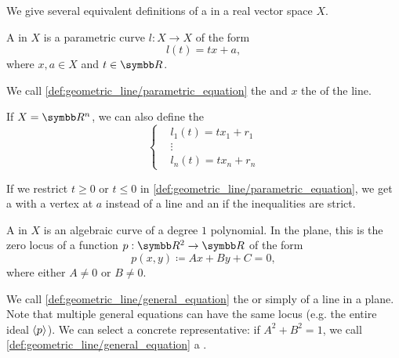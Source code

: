 \begin{definition}\label{def:geometric_line}
  We give several equivalent definitions of a  in a real vector space \( X \).

  \begin{defenum}
     A  in \( X \) is a parametric curve \( l: X \to X \) of the form
    \begin{equation}\label{def:geometric_line/parametric_equation}
      l(t) = tx + a,
    \end{equation}
    where \( x, a \in X \) and \( t \in \R \).

    We call \cref{def:geometric_line/parametric_equation} the  and \( x \) the  of the line.

    If \( X = \R^n \), we can also define the 
    \begin{equation}\label{def:geometric_line/scalar_parametric_equations}
      \begin{cases}
        &l_1(t) = t x_1 + r_1 \\
        &\vdots \\
        &l_n(t) = t x_n + r_n
      \end{cases}
    \end{equation}

     If we restrict \( t \geq 0 \) or \( t \leq 0 \) in \cref{def:geometric_line/parametric_equation}, we get a  with a vertex at \( a \) instead of a line and an  if the inequalities are strict.

     A  in \( X \) is an algebraic curve of a degree \( 1 \) polynomial. In the plane, this is the zero locus of a function \( p: \R^2 \to \R \) of the form
    \begin{equation}\label{def:geometric_line/general_equation}
      p(x, y) \coloneqq Ax + By + C = 0,
    \end{equation}
    where either \( A \neq 0 \) or \( B \neq 0 \).

    We call \cref{def:geometric_line/general_equation} the  or simply  of a line in a plane. Note that multiple general equations can have the same locus (e.g. the entire ideal \( \left\langle p \right\rangle \)). We can select a concrete representative: if \( A^2 + B^2 = 1 \), we call \cref{def:geometric_line/general_equation} a .


\end{defenum}
\end{definition}
